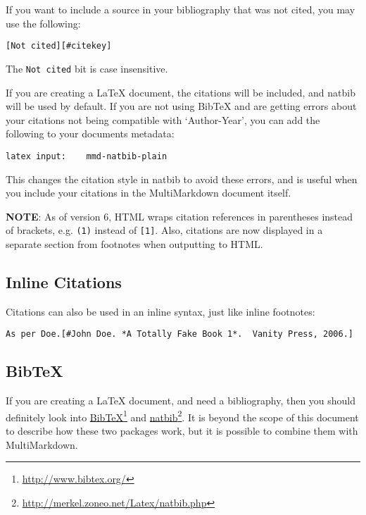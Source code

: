 If you want to include a source in your bibliography that was not cited, you may use the following:

\begin{verbatim}
[Not cited][#citekey]
\end{verbatim}

The \texttt{Not cited} bit is case insensitive.

If you are creating a LaTeX document, the citations will be included, and natbib will be used by default. If you are not using BibTeX and are getting errors about your citations not being compatible with `Author-Year', you can add the following to your documents metadata:

\begin{verbatim}
latex input:	mmd-natbib-plain
\end{verbatim}

This changes the citation style in natbib to avoid these errors, and is useful when you include your citations in the MultiMarkdown document itself.

\textbf{NOTE}: As of version 6, HTML wraps citation references in parentheses instead of brackets, e.g. \texttt{(1)} instead of \texttt{[1]}. Also, citations are now displayed in a separate section from footnotes when outputting to HTML.

\subsection{Inline Citations}
\label{inlinecitations}

Citations can also be used in an inline syntax, just like inline footnotes:

\begin{verbatim}
As per Doe.[#John Doe. *A Totally Fake Book 1*.  Vanity Press, 2006.]
\end{verbatim}

\subsection{BibTeX}
\label{bibtex}

If you are creating a LaTeX document, and need a bibliography, then you should definitely look into \href{http://www.bibtex.org/}{BibTeX}\footnote{\href{http://www.bibtex.org/}{http:\slash \slash www.bibtex.org\slash }} and \href{http://merkel.zoneo.net/Latex/natbib.php}{natbib}\footnote{\href{http://merkel.zoneo.net/Latex/natbib.php}{http:\slash \slash merkel.zoneo.net\slash Latex\slash natbib.php}}. It is beyond the scope of this document to describe how these two packages work, but it is possible to combine them with MultiMarkdown.

